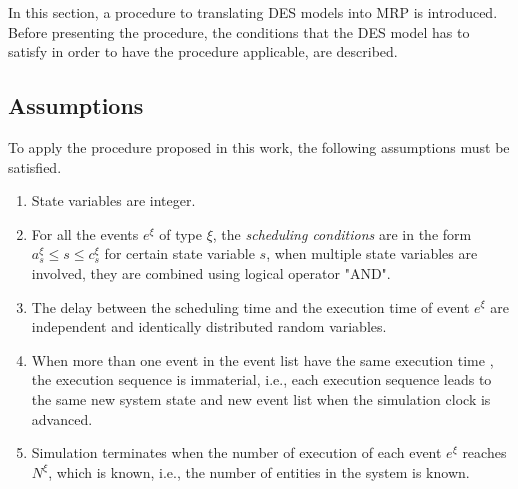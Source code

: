 \documentclass[]{interact}
\theoremstyle{plain}%
\theoremstyle{definition}
\theoremstyle{remark}
\begin{document}
In this section, a procedure to translating DES models into MRP is introduced. Before presenting the procedure, the conditions that the DES model has to satisfy in order to have the procedure applicable, are described.

\subsection{Assumptions}

To apply the procedure proposed in this work, the following assumptions must be satisfied.


\begin{enumerate}
	\item State variables are integer.
	\item For all the events $e^{\xi}$ of type $\xi$, the \textit{scheduling conditions} are in the form $a^{\xi}_s\le s \le c^{\xi}_s$ for certain state variable $s$, when multiple state variables are involved, they are combined using logical operator "AND".
	\item The delay between the scheduling time and the execution time of event $e^{\xi}$ are independent and identically distributed random variables. %
	\item When more than one event in the event list have the same execution time%
	, the execution sequence is immaterial, i.e., each execution sequence leads to the same new system state and new event list when the simulation clock is advanced.	
	\item Simulation terminates when the number of execution of each event $e^{\xi}$ reaches $N^{\xi}$, which is known, i.e., the number of entities in the system is known. 
\end{enumerate}
\end{document}
